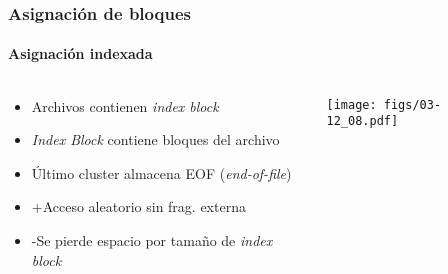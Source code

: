 \documentclass[letter]{beamer}
\begin{document}
\begin{frame}
  \frametitle{Asignación de bloques}
  \framesubtitle{Asignación indexada}

  \begin{columns}[c]
    \begin{column}[T]{6cm}
      \begin{itemize}
        \item Archivos contienen {\em index block}
        \item {\em Index Block} contiene bloques del archivo
        \item Último cluster almacena EOF ({\em end-of-file})
        \item <2-> +Acceso aleatorio sin frag. externa
        \item <3-> -Se pierde espacio por tamaño de {\em index block}
      \end{itemize}
    \end{column}
    \begin{column}[T]{5cm}
      \begin{center}
        \texttt{[image: figs/03-12\_08.pdf]}
      \end{center}
    \end{column}
  \end{columns}  

\end{frame}
\end{document}
